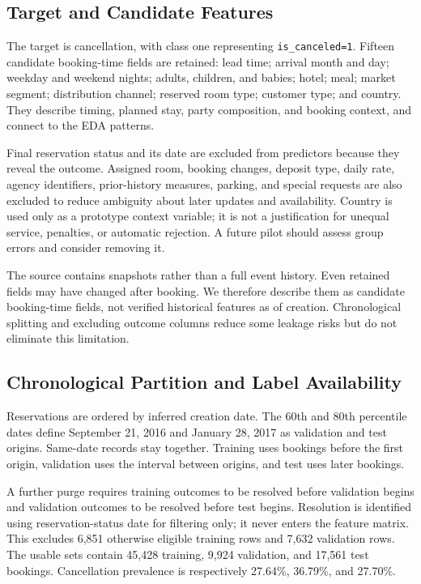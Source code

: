 \documentclass[conference]{IEEEtran}
\begin{document}
\subsection{Target and Candidate Features}
The target is cancellation, with class one representing \texttt{is\_canceled=1}. Fifteen candidate booking-time fields are retained: lead time; arrival month and day; weekday and weekend nights; adults, children, and babies; hotel; meal; market segment; distribution channel; reserved room type; customer type; and country. They describe timing, planned stay, party composition, and booking context, and connect to the EDA patterns.

Final reservation status and its date are excluded from predictors because they reveal the outcome. Assigned room, booking changes, deposit type, daily rate, agency identifiers, prior-history measures, parking, and special requests are also excluded to reduce ambiguity about later updates and availability. Country is used only as a prototype context variable; it is not a justification for unequal service, penalties, or automatic rejection. A future pilot should assess group errors and consider removing it.

The source contains snapshots rather than a full event history. Even retained fields may have changed after booking. We therefore describe them as candidate booking-time fields, not verified historical features as of creation. Chronological splitting and excluding outcome columns reduce some leakage risks but do not eliminate this limitation.

\subsection{Chronological Partition and Label Availability}
Reservations are ordered by inferred creation date. The 60th and 80th percentile dates define September 21, 2016 and January 28, 2017 as validation and test origins. Same-date records stay together. Training uses bookings before the first origin, validation uses the interval between origins, and test uses later bookings.

A further purge requires training outcomes to be resolved before validation begins and validation outcomes to be resolved before test begins. Resolution is identified using reservation-status date for filtering only; it never enters the feature matrix. This excludes 6,851 otherwise eligible training rows and 7,632 validation rows. The usable sets contain 45,428 training, 9,924 validation, and 17,561 test bookings. Cancellation prevalence is respectively 27.64\%, 36.79\%, and 27.70\%.
\end{document}
